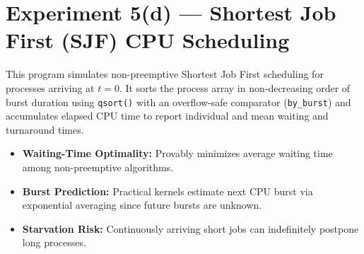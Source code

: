 \documentclass[11pt,a4paper]{article}
\newcommand{\exptheader}[3]{%
    \section[#1: #2]{#1 --- #2}%
    \label{#3}%
}
\begin{document}
\exptheader{Experiment 5(d)}{Shortest Job First (SJF) CPU Scheduling}{exp:5.d}

This program simulates non-preemptive Shortest Job First scheduling for processes arriving at $t = 0$. It sorts the process array in non-decreasing order of burst duration using \texttt{qsort()} with an overflow-safe comparator (\texttt{by\_burst}) and accumulates elapsed CPU time to report individual and mean waiting and turnaround times.

\begin{itemize}
    \item \textbf{Waiting-Time Optimality:} Provably minimizes average waiting time among non-preemptive algorithms.
    \item \textbf{Burst Prediction:} Practical kernels estimate next CPU burst via exponential averaging since future bursts are unknown.
    \item \textbf{Starvation Risk:} Continuously arriving short jobs can indefinitely postpone long processes.
\end{itemize}
\end{document}
